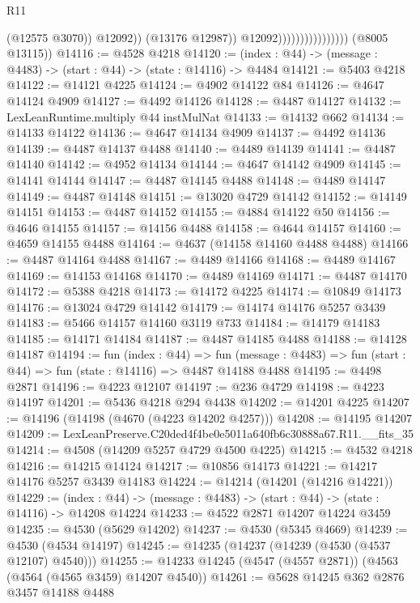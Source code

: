 \begin{lexlean}{R11}
\begin{coremodule}
                                              (@12575 @3070))
                                            @12092))
                                        (@13176 @12987))
                                      @12092))))))))))))))))
      (@8005 @13115))
@14116 := @4528 @4218
@14120 := (index : @44) -> (message : @4483) -> (start : @44) -> (state : @14116) -> @4484
@14121 := @5403 @4218
@14122 := @14121 @4225
@14124 := @4902 @14122 @84
@14126 := @4647 @14124 @4909
@14127 := @4492 @14126
@14128 := @4487 @14127
@14132 := LexLeanRuntime.multiply @44 instMulNat
@14133 := @14132 @662
@14134 := @14133 @14122
@14136 := @4647 @14134 @4909
@14137 := @4492 @14136
@14139 := @4487 @14137 @4488
@14140 := @4489 @14139
@14141 := @4487 @14140
@14142 := @4952 @14134
@14144 := @4647 @14142 @4909
@14145 := @14141 @14144
@14147 := @4487 @14145 @4488
@14148 := @4489 @14147
@14149 := @4487 @14148
@14151 := @13020 @4729 @14142
@14152 := @14149 @14151
@14153 := @4487 @14152
@14155 := @4884 @14122 @50
@14156 := @4646 @14155
@14157 := @14156 @4488
@14158 := @4644 @14157
@14160 := @4659 @14155 @4488
@14164 := @4637 (@14158 @14160 @4488 @4488)
@14166 := @4487 @14164 @4488
@14167 := @4489 @14166
@14168 := @4489 @14167
@14169 := @14153 @14168
@14170 := @4489 @14169
@14171 := @4487 @14170
@14172 := @5388 @4218
@14173 := @14172 @4225
@14174 := @10849 @14173
@14176 := @13024 @4729 @14142
@14179 := @14174 @14176 @5257 @3439
@14183 := @5466 @14157 @14160 @3119 @733
@14184 := @14179 @14183
@14185 := @14171 @14184
@14187 := @4487 @14185 @4488
@14188 := @14128 @14187
@14194 := fun (index : @44) =>
  fun (message : @4483) => fun (start : @44) => fun (state : @14116) => @4487 @14188 @4488
@14195 := @4498 @2871
@14196 := @4223 @12107
@14197 := @236 @4729
@14198 := @4223 @14197
@14201 := @5436 @4218 @294 @4438
@14202 := @14201 @4225
@14207 := @14196 (@14198 (@4670 (@4223 @14202 @4257)))
@14208 := @14195 @14207
@14209 := LexLeanPreserve.C20ded4f4be0e5011a640fb6c30888a67.R11.__fits_35
@14214 := @4508 (@14209 @5257 @4729 @4500 @4225)
@14215 := @4532 @4218
@14216 := @14215 @14124
@14217 := @10856 @14173
@14221 := @14217 @14176 @5257 @3439 @14183
@14224 := @14214 (@14201 (@14216 @14221))
@14229 := (index : @44) -> (message : @4483) -> (start : @44) -> (state : @14116) -> @14208 @14224
@14233 := @4522 @2871 @14207 @14224 @3459
@14235 := @4530 (@5629 @14202)
@14237 := @4530 (@5345 @4669)
@14239 := @4530 (@4534 @14197)
@14245 := @14235 (@14237 (@14239 (@4530 (@4537 @12107) @4540)))
@14255 := @14233 @14245 (@4547 (@4557 @2871)) (@4563 (@4564 (@4565 @3459) @14207 @4540))
@14261 := @5628 @14245 @362 @2876 @3457 @14188 @4488

\end{coremodule}
\end{lexlean}
